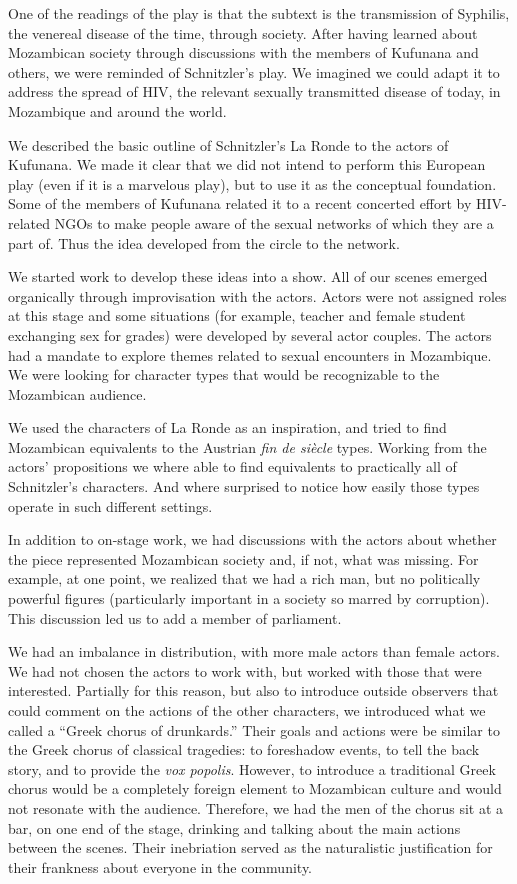 \documentclass[article,twocolumn]{memoir}
\begin{document}
One of the readings of the play is that the subtext is the transmission of
Syphilis, the venereal disease of the time, through society. After having
learned about Mozambican society through discussions with the members of
Kufunana and others, we were reminded of Schnitzler's play. We imagined we
could adapt it to address the spread of HIV, the relevant sexually transmitted
disease of today, in Mozambique and around the world.

We described the basic outline of Schnitzler's La Ronde to the actors of
Kufunana. We made it clear that we did not intend to perform this European play
(even if it is a marvelous play), but to use it as the conceptual foundation.
Some of the members of Kufunana related it to a recent concerted effort by
HIV-related NGOs to make people aware of the sexual networks of which they are
a part of. Thus the idea developed from the circle to the network.

We started work to develop these ideas into a show. All of our scenes emerged
organically through improvisation with the actors. Actors were not assigned
roles at this stage and some situations (for example, teacher and female
student exchanging sex for grades) were developed by several actor couples. The
actors had a mandate to explore themes related to sexual encounters in
Mozambique. We were looking for character types that would be recognizable to
the Mozambican audience.

We used the characters of La Ronde as an inspiration, and tried to find
Mozambican equivalents to the Austrian \textit{fin de siècle} types. Working
from the actors' propositions we where able to find equivalents to practically
all of Schnitzler's characters. And where surprised to notice how easily those
types operate in such different settings.

In addition to on-stage work, we had discussions with the actors about whether
the piece represented Mozambican society and, if not, what was missing. For
example, at one point, we realized that we had a rich man, but no politically
powerful figures (particularly important in a society so marred by corruption).
This discussion led us to add a member of parliament.

We had an imbalance in distribution, with more male actors than female actors.
We had not chosen the actors to work with, but worked with those that were
interested. Partially for this reason, but also to introduce outside observers
that could comment on the actions of the other characters, we introduced what
we called a ``Greek chorus of drunkards.'' Their goals and actions were be
similar to the Greek chorus of classical tragedies: to foreshadow events, to
tell the back story, and to provide the \textit{vox popolis}. However, to
introduce a traditional Greek chorus would be a completely foreign element to
Mozambican culture and would not resonate with the audience. Therefore, we had
the men of the chorus sit at a bar, on one end of the stage, drinking and
talking about the main actions between the scenes.  Their inebriation served as
the naturalistic justification for their frankness about everyone in the
community.
\end{document}
